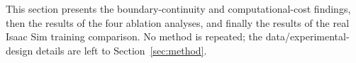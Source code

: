 This section presents the boundary-continuity and computational-cost findings, then the results of the four ablation analyses, and finally the results of the real Isaac Sim training comparison. No method is repeated; the data/experimental-design details are left to Section~\ref{sec:method}.
